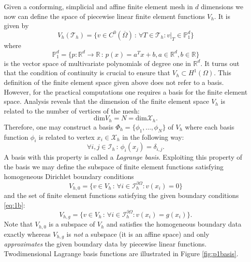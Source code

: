 \documentclass[a4paper,12pt]{article}
\begin{document}
Given a conforming, simplicial and affine finite element mesh in $d$ dimensions we
now can define the space of piecewise linear finite element functions $V_h$.
It is given by
\begin{equation}
V_h(\mathcal{T}_h) = \{ v\in C^0(\overline{\Omega}) \,:\, 
\forall T\in\mathcal{T}_h : v|_T\in\mathbb{P}_1^d\}
\label{eq:Vh}
\end{equation}
where $$\mathbb{P}_1^d = \{ p : \mathbb{R}^d \to \mathbb{R}
\,:\, p(x) = a^Tx+ b, a\in\mathbb{R}^d, b\in\mathbb{R}\}$$
is the vector space of multivariate polynomials of degree one in $\mathbb{R}^d$.
It turns out that the condition of continuity is crucial to ensure that $V_h\subset H^1(\Omega)$.
This definition of the finite element space given above does not refer to a basis.
However, for the practical computations one requires a basis for the
finite element space. Analysis reveals that the dimension of the finite element
space $V_h$ is related to the number of vertices of the mesh:
$$\text{dim} V_h = N = \text{dim} \mathcal{X}_h.$$
Therefore, one may construct a basis $\Phi_h=\{\phi_1,\ldots,\phi_N\}$ of $V_h$ 
where each basis function $\phi_i$ is related to vertex $x_i\in\mathcal{X}_h$ in the following way:
\begin{equation*}
\forall i,j\in\mathcal{I}_h \,:\, \phi_i(x_j) = \delta_{i,j}. 
\end{equation*}
A basis with this property is called a {\em Lagrange basis}.
Exploiting this property of the basis we may define the subspace of
finite element functions satisfying homogeneous Dirichlet boundary conditions
\begin{equation*}
V_{h,0} = \{v\in V_h \,:\, \forall i\in\mathcal{I}_h^{\partial\Omega} : v(x_i)=0\}
\end{equation*}
and the set of finite element functions satisfying the
given boundary conditions \eqref{eq:1b}:
\begin{equation*}
V_{h,g} = \{v\in V_h \,:\, \forall i\in\mathcal{I}_h^{\partial\Omega} : v(x_i)=g(x_i)\}.
\end{equation*}
Note that $V_{h,0}$ is a subspace of $V_h$ and satisfies the homogeneous
boundary data exactly whereas $V_{h,g}$ is {\em not} a subspace (it is an affine space)
and only {\em approximates} the given boundary data by piecewise linear functions.
Twodimensional Lagrange basis functions are illustrated in Figure \ref{fig:p1basis}.
\end{document}
